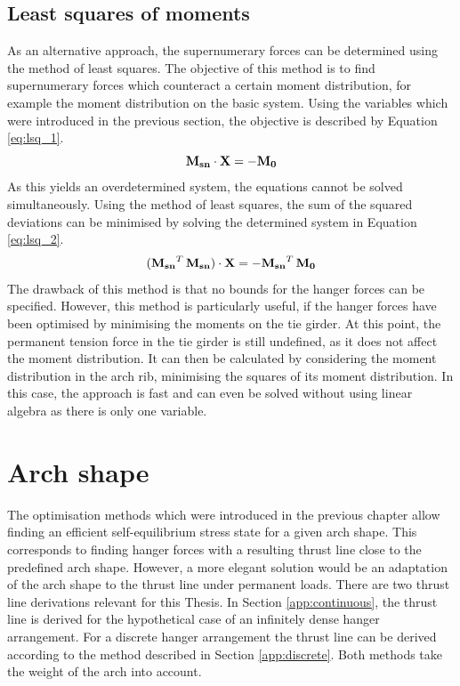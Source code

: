 \subsection{Least squares of moments}
As an alternative approach, the supernumerary forces can be determined using the method of least squares. The objective of this method is to find supernumerary forces which counteract a certain moment distribution, for example the moment distribution on the basic system. Using the variables which were introduced in the previous section, the objective is described by Equation \eqref{eq:lsq_1}.
\begin{equation}
    {\bf M_{sn}} \cdot {\bf X} = -{\bf M_0}
    \label{eq:lsq_1}
\end{equation}
As this yields an overdetermined system, the equations cannot be solved simultaneously. Using the method of least squares, the sum of the squared deviations can be minimised by solving the determined system in Equation \eqref{eq:lsq_2}.
\begin{equation}
    ({\bf M_{sn}}^T\,{\bf M_{sn}}) \cdot {\bf X} = -{\bf M_{sn}}^T\,{\bf M_0}
    \label{eq:lsq_2}
\end{equation}
The drawback of this method is that no bounds for the hanger forces can be specified. However, this method is particularly useful, if the hanger forces have been optimised by minimising the moments on the tie girder. At this point, the permanent tension force in the tie girder is still undefined, as it does not affect the moment distribution. It can then be calculated by considering the moment distribution in the arch rib, minimising the squares of its moment distribution. In this case, the approach is fast and can even be solved without using linear algebra as there is only one variable.


\newpage
\section{Arch shape} \label{sec:met_arch}
The optimisation methods which were introduced in the previous chapter allow finding an efficient self-equilibrium stress state for a given arch shape. This corresponds to finding hanger forces with a resulting thrust line close to the predefined arch shape. However, a more elegant solution would be an adaptation of the arch shape to the thrust line under permanent loads. There are two thrust line derivations relevant for this Thesis. In Section \ref{app:continuous}, the thrust line is derived for the hypothetical case of an infinitely dense hanger arrangement. For a discrete hanger arrangement the thrust line can be derived according to the method described in Section \ref{app:discrete}. Both methods take the weight of the arch into account.

